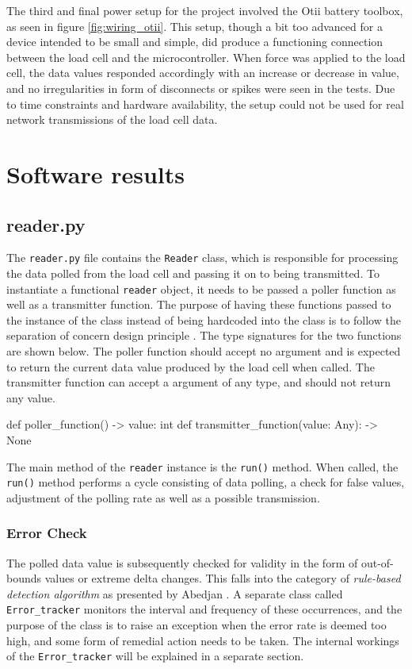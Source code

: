 The third and final power setup for the project involved the Otii battery toolbox, as seen in figure \ref{fig:wiring_otii}. This setup, though a bit too advanced for a device intended to be small and simple, did produce a functioning connection between the load cell and the microcontroller. When force was applied to the load cell, the data values responded accordingly with an increase or decrease in value, and no irregularities in form of disconnects or spikes were seen in the tests. Due to time constraints and hardware availability, the setup could not be used for real network transmissions of the load cell data.

\section{Software results}

\subsection{reader.py}
The \lstinline{reader.py} file contains the \lstinline{Reader} class, which is responsible for processing the data polled from the load cell and passing it on to being transmitted. To instantiate a functional \lstinline{reader} object, it needs to be passed a poller function as well as a transmitter function. The purpose of having these functions passed to the instance of the class instead of being hardcoded into the class is to follow the separation of concern design principle \cite{sep-concern}. The type signatures for the two functions are shown below. The poller function should accept no argument and is expected to return the current data value produced by the load cell when called. The transmitter function can accept a argument of any type, and should not return any value.
\begin{Code}
	def poller_function() -> value: int
	def transmitter_function(value: Any): -> None
\end{Code}


The main method of the \lstinline{reader} instance is the \lstinline{run()} method. When called, the \lstinline{run()} method performs a cycle consisting of data polling, a check for false values, adjustment of the polling rate as well as a possible transmission. 

\subsubsection{Error Check}
The polled data value is subsequently checked for validity in the form of out-of-bounds values or extreme delta changes. This falls into the category of \textit{rule-based detection algorithm} as presented by Abedjan \etal. A separate class called \lstinline{Error_tracker} monitors the interval and frequency of these occurrences, and the purpose of the class is to raise an exception when the error rate is deemed too high, and some form of remedial action needs to be taken. The internal workings of the \lstinline{Error_tracker} will be explained in a separate section.

